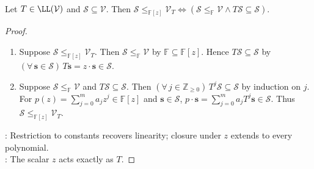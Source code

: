 \begin{theorem} \label{thm:operator-submodules-invariant-subspaces} \\
Let $T\in\LL(\mathcal{V})$ and $\mathcal{S}\subseteq\mathcal{V}$. Then $\mathcal{S}\leq_{\mathbb{F}[z]}\mathcal{V}_T\Longleftrightarrow(\mathcal{S}\leq_{\mathbb{F}}\mathcal{V}\land T\mathcal{S}\subseteq\mathcal{S})$.
\begin{proof}
\begin{enumerate}[label=\roman*.]
\setlength{\itemsep}{0pt}
\item[$(\Rightarrow)$] Suppose $\mathcal{S}\leq_{\mathbb{F}[z]}\mathcal{V}_T$. Then $\mathcal{S}\leq_{\mathbb{F}}\mathcal{V}$ by $\mathbb{F}\subseteq\mathbb{F}[z]$. Hence $T\mathcal{S}\subseteq\mathcal{S}$ by $(\forall\,\mathbf{s}\in\mathcal{S})\,T\mathbf{s}=z\cdot\mathbf{s}\in\mathcal{S}$.
\item[$(\Leftarrow)$] Suppose $\mathcal{S}\leq_{\mathbb{F}}\mathcal{V}$ and $T\mathcal{S}\subseteq\mathcal{S}$. Then $(\forall\,j\in\mathbb{Z}_{\geq0})\,T^j\mathcal{S}\subseteq\mathcal{S}$ by induction on $j$.\\
For $p(z)=\sum\limits_{j=0}^{m}a_jz^j\in\mathbb{F}[z]$ and $\mathbf{s}\in\mathcal{S}$, $p\cdot\mathbf{s}=\sum\limits_{j=0}^{m}a_jT^j\mathbf{s}\in\mathcal{S}$. Thus $\mathcal{S}\leq_{\mathbb{F}[z]}\mathcal{V}_T$.
\end{enumerate}
: Restriction to constants recovers linearity; closure under $z$ extends to every polynomial.\\
: The scalar $z$ acts exactly as $T$.
\end{proof}
\end{theorem}

